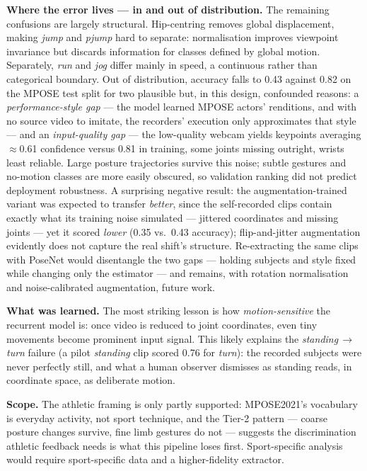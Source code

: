 \documentclass[final]{article}
\begin{document}
\textbf{Where the error lives --- in and out of distribution.} The remaining confusions are largely structural. Hip-centring removes global displacement, making \emph{jump} and \emph{pjump} hard to separate: normalisation improves viewpoint invariance but discards information for classes defined by global motion. Separately, \emph{run} and \emph{jog} differ mainly in speed, a continuous rather than categorical boundary. Out of distribution, accuracy falls to 0.43 against 0.82 on the MPOSE test split for two plausible but, in this design, confounded reasons: a \emph{performance-style gap} --- the model learned MPOSE actors' renditions, and with no source video to imitate, the recorders' execution only approximates that style --- and an \emph{input-quality gap} --- the low-quality webcam yields keypoints averaging $\approx$0.61 confidence versus 0.81 in training, some joints missing outright, wrists least reliable. Large posture trajectories survive this noise; subtle gestures and no-motion classes are more easily obscured, so validation ranking did not predict deployment robustness. A surprising negative result: the augmentation-trained variant was expected to transfer \emph{better}, since the self-recorded clips contain exactly what its training noise simulated --- jittered coordinates and missing joints --- yet it scored \emph{lower} (0.35 vs.\ 0.43 accuracy); flip-and-jitter augmentation evidently does not capture the real shift's structure. Re-extracting the same clips with PoseNet would disentangle the two gaps --- holding subjects and style fixed while changing only the estimator --- and remains, with rotation normalisation and noise-calibrated augmentation, future work.

\textbf{What was learned.} The most striking lesson is how \emph{motion-sensitive} the recurrent model is: once video is reduced to joint coordinates, even tiny movements become prominent input signal. This likely explains the \emph{standing}$\,\to\,$\emph{turn} failure (a pilot \emph{standing} clip scored 0.76 for \emph{turn}): the recorded subjects were never perfectly still, and what a human observer dismisses as standing reads, in coordinate space, as deliberate motion.

\textbf{Scope.} The athletic framing is only partly supported: MPOSE2021's vocabulary is everyday activity, not sport technique, and the Tier-2 pattern --- coarse posture changes survive, fine limb gestures do not --- suggests the discrimination athletic feedback needs is what this pipeline loses first. Sport-specific analysis would require sport-specific data and a higher-fidelity extractor.
\end{document}
